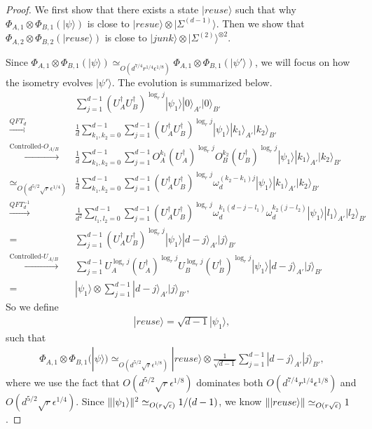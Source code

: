 \documentclass[11pt,letterpaper]{article}
\newcommand{\ket}[1]{|#1\rangle}
\newcommand{\x}{\otimes}
\newcommand{\ct}{^{\dagger}}
\DeclarePairedDelimiter{\norm}{\lVert}{\rVert}
\newcommand{\1}{\mathbb{1}}
\newcommand{\EPR}[1]{\Sigma^{(#1)}}
\newcommand{\ep}{\epsilon}
\newcommand{\se}{\sqrt{\epsilon}}
\newcommand{\qe}{\epsilon^{1/4}}
\newcommand{\sr}{\sqrt{r}}
\newcommand{\appd}[1]{\simeq_{#1}}
\theoremstyle{definition}
\begin{document}
\begin{proof}
We first show that there exists a state $\ket{reuse}$ such that 
why $ \Phi_{A,1} \x \Phi_{B,1}(\ket{\psi}) $ is close to $\ket{resue} \x \ket{\EPR{d-1}}$. 
Then we show that $\Phi_{A,2} \x \Phi_{B,2} (\ket{reuse})$ is close to $\ket{junk} \x \ket{\EPR{2}}^{\x 2}$.

Since $ \Phi_{A,1} \x \Phi_{B,1} (\ket{\psi}) \appd{O(d^{7/4} r^{1/4} \ep^{1/8})}  \Phi_{A,1} \x \Phi_{B,1} (\ket{\psi'})$,  
we will focus on how the isometry evolves $\ket{\psi'}$.
The evolution is summarized below.
	\begin{align}
		& \sum_{j=1}^{d-1} (U_A\ct U_B\ct)^{\log_r j} \ket{\psi_1} \ket{0}_{A'}\ket{0}_{B'}\\
		\xrightarrow[]{QFT_d}& \frac{1}{d}\sum_{k_1,k_2 = 0}^{d-1} \sum_{j=1}^{d-1} (U_A\ct U_B\ct)^{\log_r j}  \ket{\psi_1}\ket{k_1}_{A'}\ket{k_2}_{B'}\\
		\xrightarrow[]{\text{Controlled-}O_{A/B}}& \frac{1}{d}\sum_{k_1,k_2 = 0}^{d-1} \sum_{j=1}^{d-1} O_A^{k_1}(U_A\ct)^{\log_r j} O_B^{k_2}(U_B\ct)^{\log_r j}
		\ket{\psi_1} \ket{k_1}_{A'}\ket{k_2}_{B'}\\
		\appd{O(d^{5/2} \sr \qe)}&\frac{1}{d} \sum_{k_1,k_2 = 0}^{d-1} \sum_{j=1}^{d-1} (U_A\ct U_B\ct)^{\log_r j}\omega_d^{(k_2-k_1)j}\ket{\psi_1} \ket{k_1}_{A'}\ket{k_2}_{B'}\\
		\xrightarrow[]{QFT_d^{-1}} &\frac{1}{d^2}\sum_{l_1,l_2 = 0}^{d-1}\sum_{j=1}^{d-1} (U_A\ct U_B\ct)^{\log_r j} 
		\omega_d^{k_1(d-j-l_1)}\omega_d^{k_2(j-l_2)}\ket{\psi_1} \ket{l_1}_{A'}\ket{l_2}_{B'}\\
		= &\sum_{j=1}^{d-1}(U_A\ct U_B\ct)^{\log_r j} \ket{\psi_1} \ket{d-j}_{A'}\ket{j}_{B'} \\
		\xrightarrow[]{\text{Controlled-}U_{A/B}}& \sum_{j=1}^{d-1} U_A^{\log_r j} (U_A\ct)^{\log_r j} U_B^{\log_r j} (U_B\ct)^{\log_r j} \ket{\psi_1} \ket{d-j}_{A'}\ket{j}_{B'}\\
		=&\ket{\psi_1} \x \sum_{j=1}^{d-1} \ket{d-j}_{A'}\ket{j}_{B'},
	\end{align}
So we define 
\begin{align}
	\ket{reuse} = \sqrt{d-1}\ket{\psi_1},
\end{align}
such that 
\begin{align}
	\Phi_{A,1}\x\Phi_{B,1}(\ket{\psi}) \appd{O(d^{5/2} \sr \ep^{1/8})} \ket{reuse} \x \frac{1}{\sqrt{d-1}}\sum_{j=1}^{d-1} \ket{d-j}_{A'}\ket{j}_{B'},
\end{align}
where we use the fact that $O(d^{5/2} \sr \ep^{1/8})$ dominates both $O(d^{7/4} r^{1/4} \ep^{1/8})$ and 
$O(d^{5/2} \sr \qe)$.
Since $\norm{\ket{\psi_1}}^2 \appd{O(r \se)} 1/(d-1)$, we know $\norm{\ket{reuse}} \appd{O(r\se)} 1$.


\end{proof}
\end{document}
